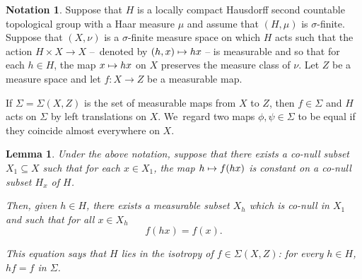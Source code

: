 \documentclass[JEP,XML,SOM,Unicode,published]{cedram}
\def\mto{\mathchoice{\longmapsto}{\mapsto}{\mapsto}{\mapsto}}
\newtheorem{lemma}{Lemma}
\theoremstyle{definition}
\newtheorem{notation}{Notation}
\begin{document}
\begin{notation} Suppose that $H$ is a locally compact Hausdorff
second countable topological group with a Haar measure $\mu$ and assume that
$(H,\mu)$ is $\sigma$-finite. Suppose that $(X,\nu)$ is a
$\sigma$-finite measure space on which $H$ acts such that the action
\hbox{$H\times X\!\to\! X$} --~denoted by $(h,x)\mto hx$ -- is measurable and so
that for each $h\in H$, the map $x\mto hx$ on $X$ preserves the
measure class of $\nu $. Let $Z$ be a measure space and let $f:X\to Z$ be
a measurable map.

If $\Sigma =\Sigma (X,Z)$ is the set of measurable maps from $X$ to $Z$, then $f\in \Sigma$ and $H$ acts on $\Sigma$ by left translations on $X$. We~regard two maps $\phi, \psi \in \Sigma$ to be equal if they coincide almost everywhere on $X$.

\end{notation}

\begin{lemma}\label{almostall} Under the above notation, suppose that there exists a co-null subset $X_1\subseteq X$ such that for each $x\in X_1$, the map $h\mto f(hx)$ is constant on a co-null subset $H_x$ of $H$.

Then, given $h\in H$, there exists a measurable subset $X_h$ which is co-null in $X_1$ and such that for all $x\in X_h$
\[
f(hx)= f(x).
\]

This equation says that $H$ lies in the isotropy of $f \in \Sigma (X,Z)$: for every $h\in H$, $hf=f$ in $\Sigma$.
\end{lemma}
\end{document}
